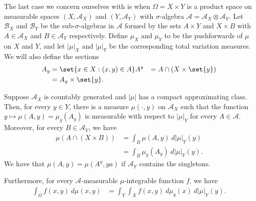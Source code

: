 \documentclass[10pt]{mypackage}
\begin{document}
The last case we concern ourselves with is when $\Omega = X\times Y$ is a product space on measurable spaces $\left( X,\mathcal{A}_X \right)$ and $\left( Y,\mathcal{A}_Y \right)$ with $\sigma$-algebra $\mathcal{A} = \mathcal{A}_X\otimes \mathcal{A}_Y$. Let $\mathcal{B}_X$ and $\mathcal{B}_Y$ be the sub-$\sigma$-algebras in $\mathcal{A}$ formed by the sets $A\times Y$ and $X\times B$ with $A\in \mathcal{A}_X$ and $B\in \mathcal{A}_Y$ respectively. Define $\mu_X$ and $\mu_Y$ to be the pushforwards of $\mu$ on $X$ and $Y$, and let $\left\vert \mu \right\vert_X$ and $\left\vert \mu \right\vert_Y$ be the corresponding total variation measures. We will also define the sections
\begin{align*}
  A_y &= \set{x\in X : \left( x,y \right)\in A}
  A^y &= A\cap \left( X\times \set{y} \right)\\
      &= A_y\times \set{y}.
\end{align*}
\begin{theorem}
  Suppose $\mathcal{A}_X$ is countably generated and $\left\vert \mu \right\vert$ has a compact approximating class. Then, for every $y\in Y$, there is a measure $\mu\left( \cdot,y \right)$ on $\mathcal{A}_X$ such that the function $y\mapsto \mu\left( A,y \right) = \mu_y\left( A_y \right)$ is measurable with respect to $\left\vert \mu \right\vert_Y$ for every $A\in \mathcal{A}$. Moreover, for every $B\in \mathcal{A}_Y$, we have
  \begin{align*}
    \mu\left( A\cap \left( X\times B \right) \right) &= \int_{B}^{} \mu\left( A,y \right)\:d\left\vert \mu \right\vert_Y(y)\\
                                                    &= \int_{B}^{} \mu_y\left( A_y \right)\:d\left\vert \mu \right\vert_Y(y).
  \end{align*}
  We have that $\mu\left( A,y \right) = \mu\left( A^y,ya \right)$ if $\mathcal{A}_Y$ contains the singletons.

  Furthermore, for every $\mathcal{A}$-measurable $\mu$-integrable function $f$, we have
  \begin{align*}
    \int_{\Omega}^{} f\left( x,y \right)\:d\mu\left( x,y \right) &= \int_{Y}^{} \int_{X}^{} f\left( x,y \right)\:d\mu_y(x)\:d\left\vert \mu \right\vert_Y(y).
  \end{align*}
\end{theorem}
\end{document}
